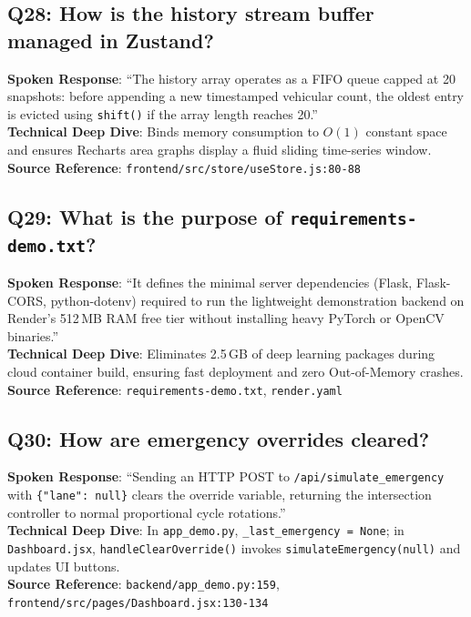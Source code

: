 \documentclass[11pt,a4paper,oneside]{report}
\begin{document}
\subsection*{Q28: How is the history stream buffer managed in Zustand?}
\begin{interviewbox}
\textbf{Spoken Response}: ``The history array operates as a FIFO queue capped at 20 snapshots: before appending a new timestamped vehicular count, the oldest entry is evicted using \texttt{shift()} if the array length reaches 20.''\\
\textbf{Technical Deep Dive}: Binds memory consumption to $O(1)$ constant space and ensures Recharts area graphs display a fluid sliding time-series window.\\
\textbf{Source Reference}: \texttt{frontend/src/store/useStore.js:80-88}
\end{interviewbox}

\subsection*{Q29: What is the purpose of \texttt{requirements-demo.txt}?}
\begin{interviewbox}
\textbf{Spoken Response}: ``It defines the minimal server dependencies (Flask, Flask-CORS, python-dotenv) required to run the lightweight demonstration backend on Render's 512\,MB RAM free tier without installing heavy PyTorch or OpenCV binaries.''\\
\textbf{Technical Deep Dive}: Eliminates 2.5\,GB of deep learning packages during cloud container build, ensuring fast deployment and zero Out-of-Memory crashes.\\
\textbf{Source Reference}: \texttt{requirements-demo.txt}, \texttt{render.yaml}
\end{interviewbox}

\subsection*{Q30: How are emergency overrides cleared?}
\begin{interviewbox}
\textbf{Spoken Response}: ``Sending an HTTP POST to \texttt{/api/simulate\_emergency} with \texttt{\{"lane": null\}} clears the override variable, returning the intersection controller to normal proportional cycle rotations.''\\
\textbf{Technical Deep Dive}: In \texttt{app\_demo.py}, \texttt{\_last\_emergency = None}; in \texttt{Dashboard.jsx}, \texttt{handleClearOverride()} invokes \texttt{simulateEmergency(null)} and updates UI buttons.\\
\textbf{Source Reference}: \texttt{backend/app\_demo.py:159}, \texttt{frontend/src/pages/Dashboard.jsx:130-134}
\end{interviewbox}
\end{document}
